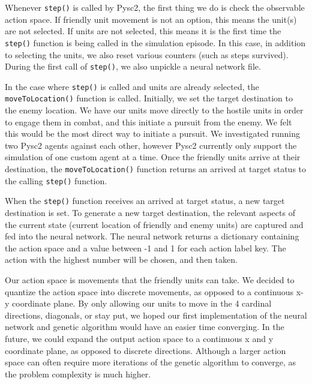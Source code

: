 \documentclass{article}
\begin{document}
\begin{multicols}{2}
Whenever \texttt{step()} is called by Pysc2, the first thing we do is check the
observable action space. If friendly unit movement is not an option, this means
the unit(s) are not selected.  If units are not selected, this means it is the
first time the \texttt{step()} function is being called in the simulation episode.  In
this case, in addition to selecting the units, we also reset various counters
(such as steps survived).  During the first call of \texttt{step()}, we also unpickle a
neural network file.

In the case where \texttt{step()} is called and units are already selected, the
\texttt{moveToLocation()} function is called.  Initially, we set the target destination
to the enemy location.  We have our units move directly to the hostile units in
order to engage them in combat, and this initiate a pursuit from the enemy.  We
felt this would be the most direct way to initiate a pursuit.  We investigated
running two Pysc2 agents against each other, however Pysc2 currently only
support the simulation of one custom agent at a time. Once the friendly units
arrive at their destination, the \texttt{moveToLocation()} function returns an arrived at
target status to the calling \texttt{step()} function.

When the \texttt{step()} function receives an arrived at target status, a new target
destination is set.  To generate a new target destination, the relevant aspects
of the current state (current location of friendly and enemy units) are captured
and fed into the neural network.  The neural network returns a dictionary
containing the action space and a value between -1 and 1 for each action label
key.  The action with the highest number will be chosen, and then taken.

Our action space is movements that the friendly units can take.  We decided to
quantize the action space into discrete movements, as opposed to a continuous
x-y coordinate plane. By only allowing our units to move in the 4 cardinal
directions, diagonals, or stay put, we hoped our first implementation of the
neural network and genetic algorithm would have an easier time converging.  In
the future, we could expand the output action space to a continuous x and y
coordinate plane, as opposed to discrete directions. Although a larger action
space can often require more iterations of the genetic algorithm to converge, as
the problem complexity is much higher.


\end{multicols}
\end{document}
